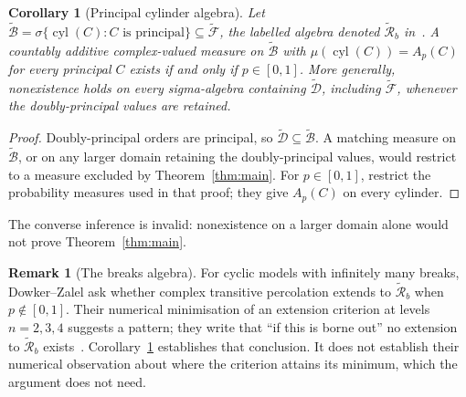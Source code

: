 \documentclass[11pt]{article}
\newtheorem{corollary}[theorem]{Corollary}
\theoremstyle{definition}
\newtheorem{remark}[theorem]{Remark}
\newcommand{\F}{\widetilde{\mathcal F}}
\newcommand{\D}{\widetilde{\mathcal D}}
\newcommand{\Bt}{\widetilde{\mathcal B}}
\newcommand{\cyl}{\operatorname{cyl}}
\begin{document}
\begin{corollary}[Principal cylinder algebra]\label{cor:larger}
Let $\Bt=\sigma\{\cyl(C): C\text{ is principal}\}\subseteq\F$, the labelled
algebra denoted $\widetilde{\mathcal R}_b$ in~\cite[Sec.~III.2]{DZ}. A
countably additive complex-valued measure on $\Bt$ with
$\mu(\cyl(C))=A_p(C)$ for every principal $C$ exists if and only if
$p\in[0,1]$. More generally, nonexistence holds on every sigma-algebra
containing $\D$, including $\F$, whenever the doubly-principal values are
retained.
\end{corollary}
\begin{proof}
Doubly-principal orders are principal, so $\D\subseteq\Bt$. A matching
measure on $\Bt$, or on any larger domain retaining the doubly-principal
values, would restrict to a measure excluded by Theorem~\ref{thm:main}. For
$p\in[0,1]$, restrict the probability measures used in that proof; they give
$A_p(C)$ on every cylinder.
\end{proof}
The converse inference is invalid: nonexistence on a larger domain alone
would not prove Theorem~\ref{thm:main}.

\begin{remark}[The breaks algebra]\label{rem:breaks}
For cyclic models with infinitely many breaks, Dowker--Zalel ask whether
complex transitive percolation extends to $\widetilde{\mathcal R}_b$ when
$p\notin[0,1]$. Their numerical minimisation of an extension criterion at
levels $n=2,3,4$ suggests a pattern; they write that ``if this is borne out''
no extension to $\widetilde{\mathcal R}_b$
exists~\cite[Sec.~III.4, Fig.~6]{DZ}. Corollary~\ref{cor:larger} establishes
that conclusion. It does not establish their numerical observation about
where the criterion attains its minimum, which the argument does not need.
\end{remark}
\end{document}
